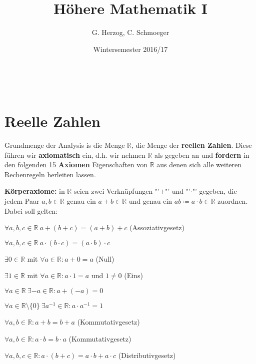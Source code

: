 \documentclass[12pt]{extreport} %
\title{Höhere Mathematik I}
\author{G. Herzog, C. Schmoeger}
\date{Wintersemester 2016/17}
\makeatletter
\newcommand{\R}{\mathbb{R}}
\theoremstyle{named}
\theoremstyle{dotless}
\def\maketitle{ \begin{titlepage} 
			~\vspace{3cm} 
		\begin{center} {\Huge \@title} \end{center} 
	 		\vspace*{1cm} 
	 	\begin{center} {\large \@author} \end{center} 
	 	\begin{center} \@date \end{center} 
	 		\vspace*{7cm} 
	 	\begin{center} \@publishers \end{center} 
	 		\vfill 
	\end{titlepage} }
\makeatother
\begin{document}
\begin{titlepage}
	\maketitle
	\thispagestyle{empty}
\end{titlepage}
	
\tableofcontents
\thispagestyle{empty}
  
\chapter{Reelle Zahlen}

Grundmenge der Analysis is die Menge $\R$, die Menge der \textbf{reellen Zahlen}. Diese führen wir \textbf{axiomatisch} ein, d.h. wir nehmen $\R$ als gegeben an und \textbf{fordern} in den folgenden 15 \textbf{Axiomen} Eigenschaften von $\R$ aus denen sich alle weiteren Rechenregeln herleiten lassen.  


\textbf{Körperaxiome:} in $\R$ seien zwei Verknüpfungen "'$+$"' und "'$\cdot$"' gegeben, die jedem Paar $a, b \in \R$ genau ein $a + b \in \R$ und genau ein $a b \coloneqq a \cdot b \in \R$ zuordnen. Dabei soll gelten:


\begin{description} \addtolength{\itemindent}{0.4cm} \label{k.axiom}
	\item[$(A1)$] $\forall a, b, c \in \R \: a + \left( b + c \right) = \left( a + b \right) + c$  (Assoziativgesetz) \label{k.axiom-a1}
	\item[$(A5)$] $\forall a, b, c \in \R \: a \cdot \left( b \cdot c \right) = \left( a \cdot b \right) \cdot c$ \label{k.axiom-a5}
	\item[$(A2)$] $\exists 0 \in \R$ mit $\forall a \in \R : a + 0 = a$ (Null) \label{k.axiom-a2}
	\item[$(A6)$] $\exists 1 \in \R$ mit $\forall a \in \R : a \cdot 1 = a$ und $1 \neq 0$ (Eins) \label{k.axiom-a6}
	\item[$(A3)$] $\forall a \in \R ~ \exists -a \in \R : a + (-a) = 0$ \label{k.axiom-a3}
	\item[$(A7)$] $\forall a \in \R \setminus \{ 0 \} ~ \exists a^{-1} \in \R : a \cdot a^{-1} = 1$ \label{k.axiom-a7}
	\item[$(A4)$] $\forall a, b \in \R : a + b = b + a$ (Kommutativgesetz) \label{k.axiom-a4}
	\item[$(A8)$] $\forall a, b \in \R : a \cdot b = b \cdot a$ \label{k.axiom-a8}(Kommutativgesetz)
	\item[$(A9)$] $\forall a, b, c \in \R : a \cdot (b + c) = a \cdot b + a \cdot c$ (Distributivgesetz) \label{k.axiom-a9}
\end{description}
\end{document}
